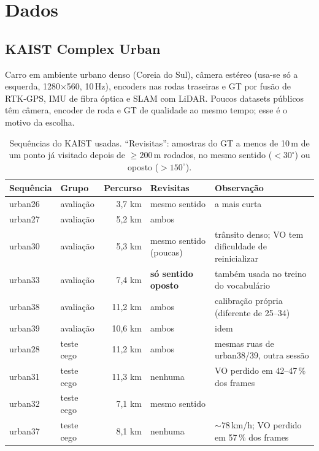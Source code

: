 \documentclass[11pt,a4paper]{article}
\begin{document}
\section{Dados}
\label{sec:dados}

\subsection{KAIST Complex Urban~\cite{jeong2019kaist}}
Carro em ambiente urbano denso (Coreia do Sul), câmera estéreo (usa-se só a esquerda, 1280$\times$560, 10\,Hz),
encoders nas rodas traseiras e GT por fusão de RTK-GPS, IMU de fibra óptica e SLAM com LiDAR. Poucos datasets públicos
têm câmera, encoder de roda e GT de qualidade ao mesmo tempo; esse é o motivo da escolha.

\begin{table}[H]\centering\small
\caption{Sequências do KAIST usadas. ``Revisitas'': amostras do GT a menos de 10\,m de um ponto já visitado depois de
$\geq 200$\,m rodados, no mesmo sentido ($<30^\circ$) ou oposto ($>150^\circ$).}
\label{tab:seqs}
\begin{tabular}{llrll}
\toprule
Sequência & Grupo & Percurso & Revisitas & Observação \\
\midrule
urban26 & avaliação & 3,7 km & mesmo sentido & a mais curta \\
urban27 & avaliação & 5,2 km & ambos & \\
urban30 & avaliação & 5,3 km & mesmo sentido (poucas) & trânsito denso; VO tem dificuldade de reinicializar \\
urban33 & avaliação & 7,4 km & \textbf{só sentido oposto} & também usada no treino do vocabulário \\
urban38 & avaliação & 11,2 km & ambos & calibração própria (diferente de 25--34) \\
urban39 & avaliação & 10,6 km & ambos & idem \\
\midrule
urban28 & teste cego & 11,2 km & ambos & mesmas ruas de urban38/39, outra sessão \\
urban31 & teste cego & 11,3 km & nenhuma & VO perdido em 42--47\,\% dos frames \\
urban32 & teste cego & 7,1 km & mesmo sentido & \\
urban37 & teste cego & 8,1 km & nenhuma & $\sim$78\,km/h; VO perdido em 57\,\% dos frames \\
\bottomrule
\end{tabular}
\end{table}
\end{document}
